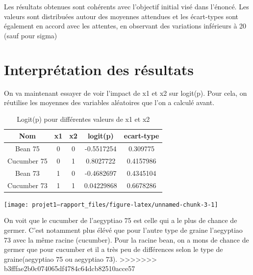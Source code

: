 \documentclass[
]{article}
\begin{document}
Les résultats obtenues sont cohérents avec l'objectif initial visé dans
l'énoncé. Les valeurs sont distribuées autour des moyennes attendues et
les écart-types sont également en accord avec les attentes, en observant
des variations inférieurs à 20 (sauf pour sigma)

\hypertarget{interpruxe9tation-des-ruxe9sultats}{%
\section{Interprétation des
résultats}\label{interpruxe9tation-des-ruxe9sultats}}

On va maintenant essayer de voir l'impact de x1 et x2 sur logit(p). Pour
cela, on réutilise les moyennes des variables aléatoires que l'on a
calculé avant.

\begin{table}[h]
\centering
\small
\begin{tabular}{|c|c|c|c|c|}
\hline
\textbf{Nom} & \textbf{x1} & \textbf{x2} & \textbf{logit(p)} & \textbf{ecart-type}\\
\hline
Bean 75 & 0 & 0 & -0.5517254 & 0.309775 \\
Cucumber 75 & 0 & 1 & 0.8027722 & 0.4157986 \\
Bean 73 & 1 & 0 & -0.4682697 & 0.4345104 \\
Cucumber 73 & 1 & 1 & 0.04229868 & 0.6678286 \\
\hline
\end{tabular}
\caption{Logit(p) pour différentes valeurs de x1 et x2}
\label{tab:tableau_combine}
\end{table}

\begin{center}\texttt{[image: projet1---rapport\_files/figure-latex/unnamed-chunk-3-1]} \end{center}

On voit que le cucumber de l'aegyptiao 75 est celle qui a le plus de
chance de germer. C'est notamment plus élévé que pour l'autre type de
graine l'aegyptiao 73 avec la même racine (cucumber). Pour la racine
bean, on a mons de chance de germer que pour cucumber et il a très peu
de différences selon le type de graine(aegyptiao 75 ou aegyptiao 73).
\textgreater\textgreater\textgreater\textgreater\textgreater\textgreater\textgreater{}
b3fffae2b0c074065df4784c64dcb82510acce57
\end{document}
